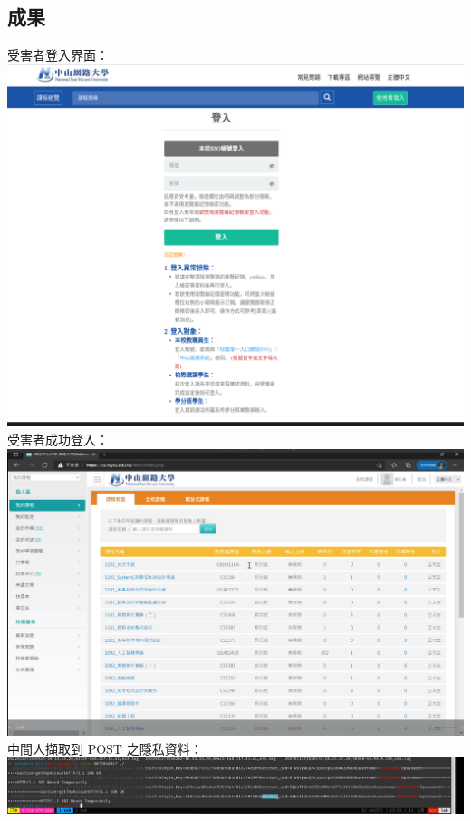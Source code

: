\documentclass[a4paper]{article}
\begin{document}
\begin{CJK*}{UTF8}{bsmi}
    \section{成果}
    受害者登入界面：\\
    \includegraphics[width=\textwidth]{images/Screenshot_2022-01-18_18-31-30.png}
    \newpage
    受害者成功登入：\\
    \includegraphics[width=\textwidth]{images/Screenshot_2022-01-18_18-24-27.png}\\
    中間人擷取到 POST 之隱私資料：\\
    \includegraphics[width=\textwidth]{images/Screenshot_2022-01-18_18-28-12.png}
    \label{data_mid}


\end{CJK*}
\end{document}
